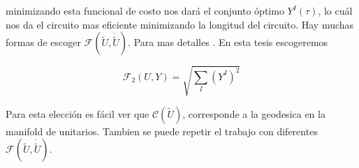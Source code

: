 \documentclass[../Main.tex]{subfiles}
\begin{document}
minimizando esta funcional de costo nos dará el conjunto óptimo $Y^{I}(\tau)$, lo cuál nos da el circuito mas eficiente minimizando la longitud del circuito. Hay muchas formas de escoger $\mathcal{F}(\tilde U,\dot{\tilde U})$. Para mas detalles \citep{Nielsen_2006}. En esta tesis escogeremos

\begin{equation}
\mathcal{F}_2(U,Y)=\sqrt{\sum_{I} (Y^{I})^2}
\label{cost}
\end{equation}

Para esta elección es fácil ver que $\mathcal{C}(\tilde U)$, corresponde a la geodesica en la manifold de unitarios. Tambien se puede repetir el trabajo con diferentes $\mathcal{F}(\tilde U,\dot{\tilde U})$. 


\end{document}
